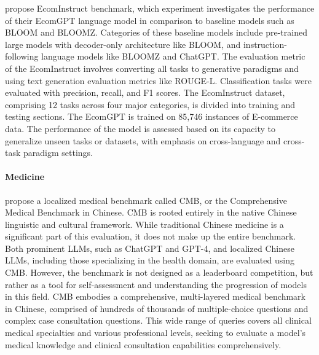 \citet{li2023ecomgpt} propose EcomInstruct benchmark, which experiment investigates the performance of their EcomGPT language model in comparison to baseline models such as BLOOM and BLOOMZ. Categories of these baseline models include pre-trained large models with decoder-only architecture like BLOOM, and instruction-following language models like BLOOMZ and ChatGPT. The evaluation metric of the EcomInstruct involves converting all tasks to generative paradigms and using text generation evaluation metrics like ROUGE-L. Classification tasks were evaluated with precision, recall, and F1 scores. The EcomInstruct dataset, comprising 12 tasks across four major categories, is divided into training and testing sections. The EcomGPT is trained on 85,746 instances of E-commerce data. The performance of the model is assessed based on its capacity to generalize unseen tasks or datasets, with emphasis on cross-language and cross-task paradigm settings.


{\paragraph{Medicine}}
\citet{wang2023cmb} propose a localized medical benchmark called CMB, or the Comprehensive Medical Benchmark in Chinese. CMB is rooted entirely in the native Chinese linguistic and cultural framework. While traditional Chinese medicine is a significant part of this evaluation, it does not make up the entire benchmark.
Both prominent LLMs, such as ChatGPT and GPT-4, and localized Chinese LLMs, including those specializing in the health domain, are evaluated using CMB. However, the benchmark is not designed as a leaderboard competition, but rather as a tool for self-assessment and understanding the progression of models in this field.
CMB embodies a comprehensive, multi-layered medical benchmark in Chinese, comprised of hundreds of thousands of multiple-choice questions and complex case consultation questions. This wide range of queries covers all clinical medical specialties and various professional levels, seeking to evaluate a model's medical knowledge and clinical consultation capabilities comprehensively.
 
